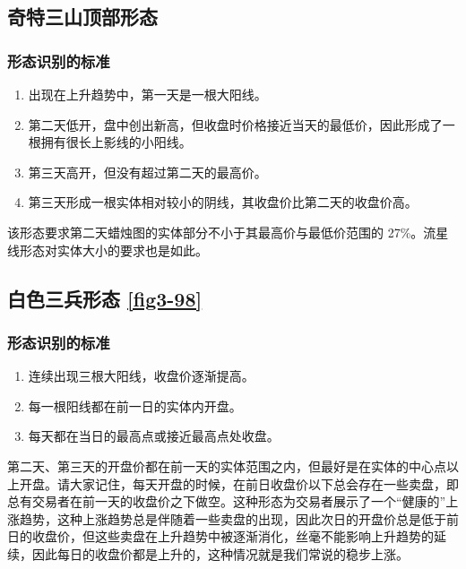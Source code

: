 \subsection{奇特三山顶部形态}
\subsubsection*{形态识别的标准}
\begin{enumerate}
    \item 出现在上升趋势中，第一天是一根大阳线。
    \item 第二天低开，盘中创出新高，但收盘时价格接近当天的最低价，因此形成了一根拥有很长上影线的小阳线。
    \item 第三天高开，但没有超过第二天的最高价。
    \item 第三天形成一根实体相对较小的阴线，其收盘价比第二天的收盘价高。
\end{enumerate}

该形态要求第二天蜡烛图的实体部分不小于其最高价与最低价范围的 27\%。流星线形态对实体大小的要求也是如此。
\subsection{白色三兵形态 \autoref{fig3-98}}
\subsubsection*{形态识别的标准}
\begin{enumerate}
    \item 连续出现三根大阳线，收盘价逐渐提高。
    \item 每一根阳线都在前一日的实体内开盘。
    \item 每天都在当日的最高点或接近最高点处收盘。
\end{enumerate}

第二天、第三天的开盘价都在前一天的实体范围之内，但最好是在实体的中心点以上开盘。请大家记住，每天开盘的时候，在前日收盘价以下总会存在一些卖盘，即总有交易者在前一天的收盘价之下做空。这种形态为交易者展示了一个“健康的”上涨趋势，这种上涨趋势总是伴随着一些卖盘的出现，因此次日的开盘价总是低于前日的收盘价，但这些卖盘在上升趋势中被逐渐消化，丝毫不能影响上升趋势的延续，因此每日的收盘价都是上升的，这种情况就是我们常说的稳步上涨。
